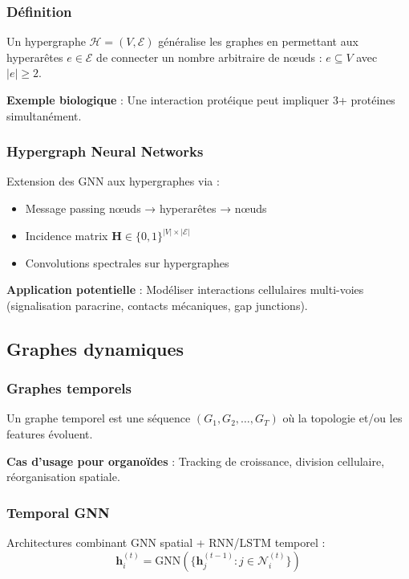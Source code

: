 \subsubsection{Définition}

Un hypergraphe $\mathcal{H} = (V, \mathcal{E})$ généralise les graphes en permettant aux hyperarêtes $e \in \mathcal{E}$ de connecter un nombre arbitraire de nœuds : $e \subseteq V$ avec $|e| \geq 2$.

\textbf{Exemple biologique} : Une interaction protéique peut impliquer 3+ protéines simultanément.

\subsubsection{Hypergraph Neural Networks}

Extension des GNN aux hypergraphes via :
\begin{itemize}
    \item Message passing nœuds → hyperarêtes → nœuds
    \item Incidence matrix $\mathbf{H} \in \{0,1\}^{|V| \times |\mathcal{E}|}$
    \item Convolutions spectrales sur hypergraphes
\end{itemize}

\textbf{Application potentielle} : Modéliser interactions cellulaires multi-voies (signalisation paracrine, contacts mécaniques, gap junctions).

\subsection{Graphes dynamiques}

\subsubsection{Graphes temporels}

Un graphe temporel est une séquence $(G_1, G_2, \ldots, G_T)$ où la topologie et/ou les features évoluent.

\textbf{Cas d'usage pour organoïdes} : Tracking de croissance, division cellulaire, réorganisation spatiale.

\subsubsection{Temporal GNN}

Architectures combinant GNN spatial + RNN/LSTM temporel :
\[
\mathbf{h}_i^{(t)} = \text{GNN}\left(\{\mathbf{h}_j^{(t-1)} : j \in \mathcal{N}_i^{(t)}\}\right)
\]

